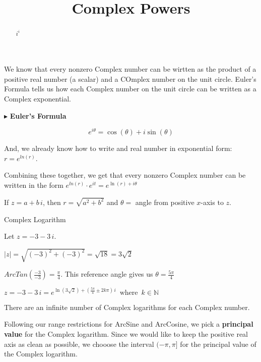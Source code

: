 \documentclass{ximera}
\title{Complex Powers}
\begin{document}
\begin{abstract}
$i^i$
\end{abstract}
\maketitle





We know that every nonzero Complex number can be wirtten as the product of a positive real number (a scalar) and a COmplex number on the unit circle.  Euler's Formula tells us how each Complex number on the unit circle can be written as a Complex exponential.


$\blacktriangleright$ \textbf{Euler's Formula}


\[   e^{i \theta} = \cos(\theta) + i \sin(\theta)         \]


And, we already know how to write and real number in exponential form: $r = e^{ln(r)}$.  

Combining these together, we get that every nonzero Complex number can be written in the form  $e^{ln(r)} \cdot e^{i t} = e^{\ln(r) + i \theta}$




If $z = a + b \, i$, then $r = \sqrt{a^2 + b^2}$ and $\theta = $ angle from positive $x$-axis to $z$.







\begin{example} Complex Logarithm


Let $z = -3 - 3 \, i$.


$|z| = \sqrt{(-3)^2 + (-3)^2} =  \sqrt{18} = 3 \sqrt{2}$


$ArcTan\left(\frac{-3}{-3}\right) = \frac{\pi}{4}$.  This reference angle gives us $\theta = \frac{5 \pi}{4}$




$z = -3 - 3 \, i =  e^{\ln(3 \sqrt{2}) + (\tfrac{5 \pi}{4} \pm 2 k \pi) \, i}     \, \text{ where } \, k \in \mathbb{N}  $

\end{example}




There are an infinite number of Complex logarithms for each Complex number.


Following our range restrictions for ArcSine and ArcCosine, we pick a \textbf{principal value} for the Complex logarithm. Since we would like to keep the positive real axis as clean as possible, we chooose the interval $(-\pi, \pi]$ for the principal value of the Complex logarithm.
\end{document}
